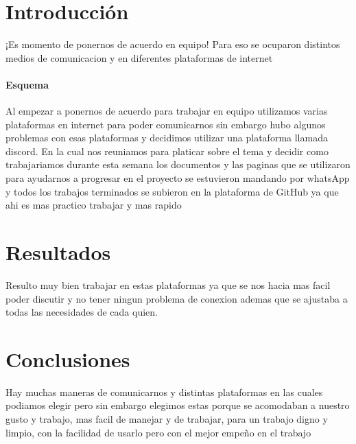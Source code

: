 \documentclass[12pt]{article}
\begin{document}
\maketitle


\section{Introducción}
¡Es momento de ponernos de acuerdo en equipo!
Para eso se ocuparon distintos medios de comunicacion
y en diferentes plataformas de internet \\

\paragraph{Esquema}
Al empezar a ponernos de acuerdo para trabajar en equipo utilizamos varias plataformas en internet
para poder comunicarnos sin embargo hubo algunos problemas con esas plataformas y decidimos utilizar una plataforma
llamada discord. En la cual nos reuniamos para platicar sobre el tema y decidir como trabajariamos durante esta semana
los documentos y las paginas que se utilizaron para ayudarnos a progresar en el proyecto se estuvieron mandando por whatsApp
y todos los trabajos terminados se subieron en la plataforma de GitHub ya que ahi es mas practico trabajar y mas rapido\\

\section{Resultados} \label{resultados}
Resulto muy bien trabajar en estas plataformas ya que se nos hacia mas facil poder discutir y no tener ningun problema de conexion ademas que se ajustaba a todas las necesidades de cada quien.\\

\section{Conclusiones} \label{conclusiones}
Hay muchas maneras de comunicarnos y distintas plataformas en las cuales podiamos elegir pero sin embargo elegimos estas
porque se acomodaban a nuestro gusto y trabajo, mas facil de manejar y de trabajar, para un trabajo digno y limpio, con la facilidad de usarlo pero con el mejor empeño en el trabajo\\



\end{document}
